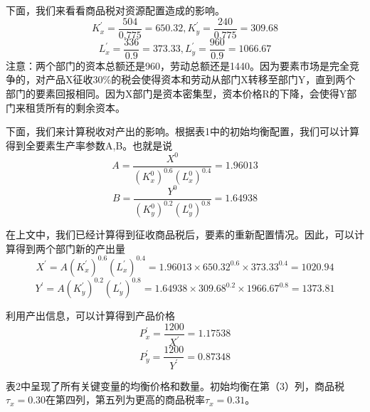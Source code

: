 \documentclass[cn,12pt,math=newtx,citestyle=gb7714-2015,bibstyle=gb7714-2015]{elegantbook}
\begin{document}
	下面，我们来看看商品税对资源配置造成的影响。
	$$K_x^{'}=\frac{504}{0.775}=650.32,K_y^{'}=\frac{240}{0.775}=309.68$$
	$$L_x^{'}=\frac{336}{0.9}=373.33,L_y^{'}=\frac{960}{0.9}=1066.67$$
	注意：两个部门的资本总额还是960，劳动总额还是1440。因为要素市场是完全竞争的，对产品X征收30\%的税会使得资本和劳动从部门X转移至部门Y，直到两个部门的要素回报相同。因为X部门是资本密集型，资本价格R的下降，会使得Y部门来租赁所有的剩余资本。
	
	下面，我们来计算税收对产出的影响。根据表1中的初始均衡配置，我们可以计算得到全要素生产率参数A,B。也就是说
	$$A=\frac{X^0}{(K_x^0)^{0.6}(L_x^0)^{0.4}}=1.96013$$
	$$B=\frac{Y^0}{(K_y^0)^{0.2}(L_y^0)^{0.8}}=1.64938$$
	
	在上文中，我们已经计算得到征收商品税后，要素的重新配置情况。因此，可以计算得到两个部门新的产出量
	$$X^{'}=A(K_x^{'})^{0.6}(L_x^{'})^{0.4}=1.96013\times 650.32^{0.6}\times 373.33^{0.4}=1020.94$$
	$$Y^{'}=A(K_y^{'})^{0.2}(L_y^{'})^{0.8}=1.64938\times 309.68^{0.2}\times 1966.67^{0.8}=1373.81$$
	
	利用产出信息，可以计算得到产品价格
	$$P_x^{'}=\frac{1200}{X^{'}}=1.17538$$
	$$P_y^{'}=\frac{1200}{Y^{'}}=0.87348$$
	
	表2中呈现了所有关键变量的均衡价格和数量。初始均衡在第（3）列，商品税$\tau_x=0.30$在第四列，第五列为更高的商品税率$\tau_x=0.31$。
	
\end{document}
